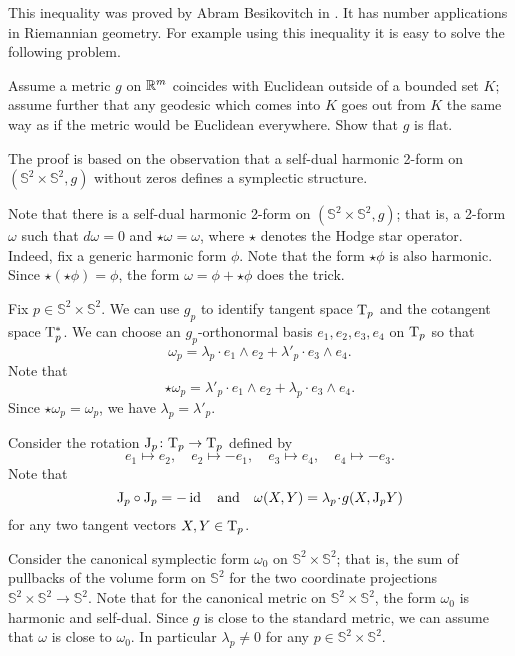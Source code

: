 This inequality was proved by Abram Besikovitch in \cite{besicovitch}.
It has number applications in Riemannian geometry.
For example using this inequality it is easy to solve the following problem.

\begin{pr}
Assume a metric $g$ on $\mathbb{R}^m$ coincides with Euclidean outside of a bounded set $K$;
assume further that any geodesic which comes into $K$ goes out from $K$ the same way as if the metric would be Euclidean everywhere. 
Show that $g$ is flat.
\end{pr}


The proof is based on the observation that a self-dual harmonic 2-form on $(\mathbb{S}^2\times\mathbb{S}^2,g)$
without zeros defines a symplectic structure.

\medskip

Note that there is a self-dual harmonic 2-form on $(\mathbb{S}^2\times\mathbb{S}^2,g)$;
that is, a 2-form $\omega$ such that $d\omega=0$ and $\star\omega=\omega$,
where $\star$ denotes the Hodge star operator.
Indeed, fix a generic harmonic form $\phi$.
Note that the form $\star\phi$ is also harmonic.
Since $\star(\star\phi)=\phi$,
the form $\omega=\phi+\star\phi$ does the trick.

Fix $p\in \mathbb{S}^2\times\mathbb{S}^2$.
We can use $g_p$ to identify tangent space $\mathrm{T}_p$ and the cotangent space $\mathrm{T}^*_p$.
We can choose an $g_p$-orthonormal basis $e_1, e_2, e_3, e_4$ on $\mathrm{T}_p$ so that 
\[\omega_p=\lambda_p\cdot e_1\wedge e_2+\lambda'_p\cdot  e_3\wedge e_4.\]
Note that 
\[\star\omega_p=\lambda'_p\cdot e_1\wedge e_2+\lambda_p\cdot  e_3\wedge e_4.\]
Since $\star\omega_p=\omega_p$, we have $\lambda_p=\lambda'_p$.

Consider the rotation $\mathrm{J}_p\colon\mathrm{T}_p\to\mathrm{T}_p$ defined by 
\[ 
e_1\mapsto e_2,
\quad 
e_2\mapsto -e_1,
\quad 
e_3\mapsto e_4,
\quad 
e_4\mapsto-e_3.\]
Note that
\[\mathrm{J}_p\circ\mathrm{J}_p =-\id
\quad\text{and}\quad
\omega(X,Y)=\lambda_p\cdot g(X,\mathrm{J}_pY)\] 
for any two tangent vectors $X,Y\in \mathrm{T}_p$.

Consider the canonical symplectic form $\omega_0$ on $\mathbb{S}^2\times\mathbb{S}^2$;
that is, the sum of pullbacks of the volume form on $\mathbb{S}^2$  
for the two coordinate projections $\mathbb{S}^2\times\mathbb{S}^2\to \mathbb{S}^2$.
Note that for the canonical metric on $\mathbb{S}^2\times\mathbb{S}^2$,
the form $\omega_0$ is harmonic and self-dual. 
Since $g$ is close to the standard metric,
we can assume that $\omega$ is close to $\omega_0$.
In particular $\lambda_p\ne0$ for any $p\in \mathbb{S}^2\times\mathbb{S}^2$.

